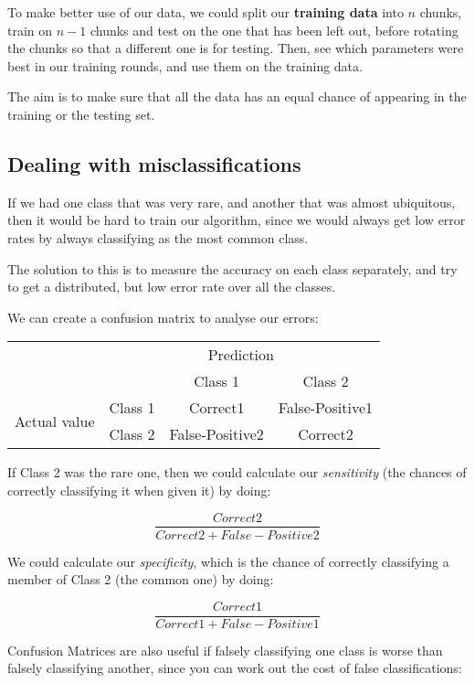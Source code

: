 To make better use of our data, we could split our \textbf{training data} into
$n$ chunks, train on $n-1$ chunks and test on the one that has been left out,
before rotating the chunks so that a different one is for testing. Then, see
which parameters were best in our training rounds, and use them on the training
data.

The aim is to make sure that all the data has an equal chance of appearing in
the training or the testing set.

\subsection{Dealing with misclassifications}

If we had one class that was very rare, and another that was almost ubiquitous,
then it would be hard to train our algorithm, since we would always get low
error rates by always classifying as the most common class.

The solution to this is to measure the accuracy on each class separately, and
try to get a distributed, but low error rate over all the classes.

We can create a confusion matrix to analyse our errors:

\begin{table}[H]
  \centering
  \begin{tabular}{lc|c|c}
    & \multicolumn{3}{c}{Prediction} \\
    & & Class 1 & Class 2 \\ \cline{2-4}
    \multirow{2}{*}{Actual value} & Class 1 & Correct1 & False-Positive1\\ \cline{2-4}
    & Class 2 & False-Positive2 & Correct2\\
  \end{tabular}
\end{table}

If Class 2 was the rare one, then we could calculate our \textit{sensitivity}
(the chances of correctly classifying it when given it) by doing:

\[
  \frac{Correct2}{Correct2 + False-Positive2}
\]

We could calculate our \textit{specificity}, which is the chance of correctly
classifying a member of Class 2 (the common one) by doing:

\[
  \frac{Correct1}{Correct1 + False-Positive1}
\]

Confusion Matrices are also useful if falsely classifying one class is worse
than falsely classifying another, since you can work out the cost of false
classifications:

